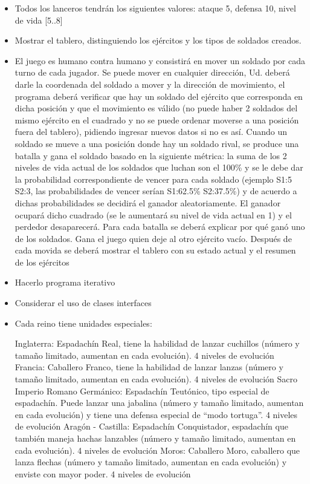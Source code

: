 \documentclass{article}
\begin{document}
\begin{itemize}
        \item Todos los lanceros tendrán los siguientes valores: ataque 5, defensa 10, nivel de vida [5..8]

        \item Mostrar el tablero, distinguiendo los ejércitos y los tipos de soldados creados.
        
        \item El juego es humano contra humano y consistirá en mover un soldado por cada turno de cada jugador. Se puede mover en cualquier dirección, Ud. deberá darle la coordenada del soldado a mover y la dirección de movimiento, el programa deberá verificar que hay un soldado del ejército que corresponda en dicha posición y que el movimiento es válido (no puede haber 2 soldados del mismo ejército en el cuadrado y no se puede ordenar moverse a una posición fuera del tablero), pidiendo ingresar nuevos datos si no es así. Cuando un soldado se mueve a una posición donde hay un soldado rival, se produce una batalla y gana el soldado basado en la siguiente métrica: la suma de los 2 niveles de vida actual de los soldados que luchan son el 100\% y se le debe dar la probabilidad correspondiente de vencer para cada soldado (ejemplo S1:5 S2:3, las probabilidades de vencer serían S1:62.5\% S2:37.5\%) y de acuerdo a dichas probabilidades se decidirá el ganador aleatoriamente. El ganador ocupará dicho cuadrado (se le aumentará su nivel de vida actual en 1) y el perdedor desaparecerá. Para cada batalla se deberá explicar por qué ganó uno de los soldados. Gana el juego quien deje al otro ejército vacío. Después de cada movida se deberá mostrar el tablero con su estado actual y el resumen de los ejércitos

        \item Hacerlo programa iterativo
        
        \item Considerar el uso de clases interfaces
        
        \item Cada reino tiene unidades especiales:

        \subitem Inglaterra: Espadachín Real, tiene la habilidad de lanzar cuchillos (número y tamaño limitado, aumentan en cada evolución). 4 niveles de evolución
        \subitem Francia: Caballero Franco, tiene la habilidad de lanzar lanzas (número y tamaño limitado, aumentan en cada evolución). 4 niveles de evolución
        \subitem Sacro Imperio Romano Germánico: Espadachín Teutónico, tipo especial de espadachín. Puede lanzar una jabalina (número y tamaño limitado, aumentan en cada evolución) y tiene una defensa especial de “modo tortuga”. 4 niveles de evolución
        \subitem Aragón - Castilla: Espadachín Conquistador, espadachín que también maneja hachas lanzables (número y tamaño limitado, aumentan en cada evolución). 4 niveles de evolución
        \subitem Moros: Caballero Moro, caballero que lanza flechas (número y tamaño limitado, aumentan en cada evolución) y enviste con mayor poder. 4 niveles de evolución


\end{itemize}
\end{document}
